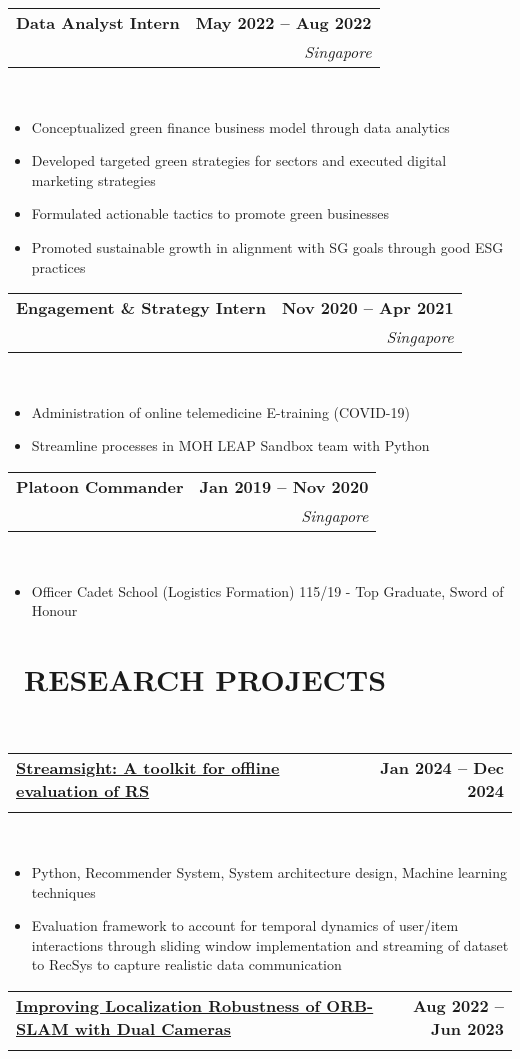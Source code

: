 \documentclass[10pt,a4paper]{article}
\makeatletter
\newcommand{\cvsectionfontsize}{11}       %
\newcommand{\cvtaglinefirstfontsize}{11}  %
\newcommand{\cvtaglinesecondfontsize}{10} %
\newcommand{\cvbulletfontsize}{10}        %
\newcommand{\cvsection}[3][.2em]{
  \vspace{-2.7em} %
  \section[#3]{\textbf{\scalebox{.68}{\faIcon{#2}}~\fontsize{\cvsectionfontsize}{\cvsectionfontsize}\selectfont\MakeUppercase{#3}}}
  \vspace{-1.8em}
  \noindent\makebox[\textwidth]{\rule{\textwidth}{0.4pt}}
  \\
  \vspace{#1} %
}
\newcommand{\cvtagline}[5][1em]{
  \vspace{-1em} %
  \noindent\begin{tabularx}{\textwidth}{@{}Xr@{}}
    {\fontsize{\cvtaglinefirstfontsize}{\cvtaglinefirstfontsize}\selectfont\textbf{#2}} & 
    {\fontsize{\cvtaglinefirstfontsize}{\cvtaglinefirstfontsize}\selectfont\textbf{#3}} \\ %
    {\fontsize{\cvtaglinesecondfontsize}{\cvtaglinesecondfontsize}\selectfont{#4}} & 
    {\fontsize{\cvtaglinesecondfontsize}{\cvtaglinesecondfontsize}\selectfont\textit{#5}} \\ %
  \end{tabularx}
  \\
  \vspace{#1} %
}
\newcommand{\cvbullets}[2][1em]{
  \vspace{-2.1em} %
  {\fontsize{\cvbulletfontsize}{\cvbulletfontsize}\selectfont
    \begin{itemize}[left=0pt,labelsep=1em]
      \setlength\itemsep{0.2em} %
      \setlength\labelwidth{1em} %
      \setlength\parskip{0pt} %
      #2
    \end{itemize}
  }
  \vspace{#1} %
}
\makeatother
\begin{document}
\cvtagline{Data Analyst Intern}{May 2022 -- Aug 2022}{REANGLE Pte Ltd  [Sustainability]  $ | $ Supervisor: Kazu Watanabe [CEO]}{Singapore}

\cvbullets{
  \item Conceptualized green finance business model through data analytics
  \item Developed targeted green strategies for sectors and executed digital marketing
  strategies
  \item Formulated actionable tactics to promote green businesses
  \item Promoted sustainable growth in alignment with SG goals through good ESG
  practices }

\cvtagline{Engagement \& Strategy Intern}{Nov 2020 -- Apr 2021}{Ministry of Health $ | $ Supervisor: Weng Chee}{Singapore}

\cvbullets{
  \item Administration of online telemedicine E-training (COVID-19)
  \item Streamline processes in MOH LEAP Sandbox team with Python }

\cvtagline{Platoon Commander}{Jan 2019 -- Nov 2020}{Singapore Armed Forces}{Singapore}

\cvbullets{
  \item Officer Cadet School (Logistics Formation) 115/19 - Top Graduate, Sword of
  Honour }

\newpage

\cvsection{lightbulb}{Research Projects}

\cvtagline{\href{https://github.com/HiIAmTzeKean/Streamsight}{Streamsight: A toolkit for offline evaluation of RS}}{Jan 2024 -- Dec 2024}{FYP, grade obtained: A+ | Supervisor: Prof. Sun Aixin [Associate Dean Academics]}{}

\cvbullets{
  \item Python, Recommender System, System architecture design, Machine learning
  techniques
  \item Evaluation framework to account for temporal dynamics of user/item interactions
  through sliding window implementation and streaming of dataset to RecSys to
  capture realistic data communication }

\cvtagline{\href{https://github.com/HiIAmTzeKean/Jetson-Nano-SLAM}{Improving Localization Robustness of ORB-SLAM with Dual Cameras}}{Aug 2022 -- Jun 2023}{NTU President Scholar (Merit) | Supervisor: Prof. Lam Siew Kei [Assistant Chair Admission]}{}
\end{document}
